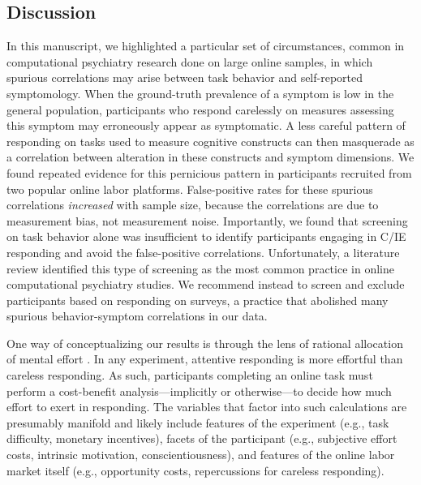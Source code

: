 \documentclass[a4paper,notitlepage,12pt]{article}
\begin{document}
\begin{refsection}[main]
\section*{Discussion}

In this manuscript, we highlighted a particular set of circumstances, common in computational psychiatry research done on large online samples, in which spurious correlations may arise between task behavior and self-reported symptomology. When the ground-truth prevalence of a symptom is low in the general population, participants who respond carelessly on measures assessing this symptom may erroneously appear as symptomatic. A less careful pattern of responding on tasks used to measure cognitive constructs can then masquerade as a correlation between alteration in these constructs and symptom dimensions. We found repeated evidence for this pernicious pattern in participants recruited from two popular online labor platforms. False-positive rates for these spurious correlations \emph{increased} with sample size, because the correlations are due to measurement bias, not measurement noise. Importantly, we found that screening on task behavior alone was insufficient to identify participants engaging in C/IE responding and avoid the false-positive correlations. Unfortunately, a literature review identified this type of screening as the most common practice in online computational psychiatry studies. We recommend instead to screen and exclude participants based on responding on surveys, a practice that abolished many spurious behavior-symptom correlations in our data. 

One way of conceptualizing our results is through the lens of rational allocation of mental effort \cite{kool2018mental}. In any experiment, attentive responding is more effortful than careless responding. As such, participants completing an online task must perform a cost-benefit analysis---implicitly or otherwise---to decide how much effort to exert in responding. The variables that factor into such calculations are presumably manifold and likely include features of the experiment (e.g., task difficulty, monetary incentives), facets of the participant (e.g., subjective effort costs, intrinsic motivation, conscientiousness), and features of the online labor market itself (e.g., opportunity costs, repercussions for careless responding). 


\end{refsection}
\end{document}
